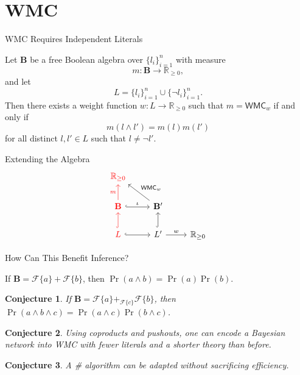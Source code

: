 \documentclass{beamer}
\newtheorem{conjecture}{Conjecture}
\begin{document}
\section{WMC}

\begin{frame}{WMC Requires Independent Literals}
  \begin{theorem}
    Let $\mathbf{B}$ be a free Boolean algebra over $\{ l_i \}_{i=1}^n$ with
    measure
    \[
      m\colon \mathbf{B} \to \mathbb{R}_{\ge 0},
    \]
    and let
    \[
      L = \{ l_i \}_{i = 1}^n \cup \{\neg l_i \}_{i = 1}^n.
    \]
    Then there exists a weight function $w\colon L \to \mathbb{R}_{\ge 0}$ such
    that $m = \mathsf{WMC}_w$ if and only if
    \[
      m(l \land l') = m(l)m(l')
    \]
    for all distinct $l, l' \in L$ such that $l \ne \neg l'$.
  \end{theorem}
\end{frame}

\begin{frame}[fragile]{Extending the Algebra}
  \[
    \begin{tikzcd}
      \textcolor{red}{\mathbb{R}_{\ge 0}} & & \\
      \textcolor{red}{\mathbf{B}} \arrow[red]{u}{m} \ar[r,hookrightarrow,"\iota"]
      & \mathbf{B'} \arrow{lu}[swap]{\mathsf{WMC}_w} & \\
      \textcolor{red}{L} \ar[u,red,hookrightarrow] \ar[r,hookrightarrow] & L'
      \ar[u,hookrightarrow] \arrow{r}{w} & \mathbb{R}_{\ge 0}
    \end{tikzcd}
  \]
\end{frame}

\begin{frame}{How Can This Benefit Inference?}
  \begin{theorem}
    If $\mathbf{B} = \mathcal{F}\{a\} + \mathcal{F}\{b\}$, then $\Pr(a \land b) =
    \Pr(a)\Pr(b)$.
  \end{theorem}
  \pause
  \begin{conjecture}
    If $\mathbf{B} = \mathcal{F}\{a\} +_{\mathcal{F}\{c\}} \mathcal{F}\{b\}$, then $\Pr(a
    \land b \land c) = \Pr(a \land c)\Pr(b \land c)$.
  \end{conjecture}
  \pause
  \begin{conjecture}
    Using coproducts and pushouts, one can encode a Bayesian network into WMC
    with \alert{fewer literals} and a \alert{shorter theory} than before.
  \end{conjecture}
  \pause
  \begin{conjecture}
    A \#\SAT{} algorithm can be adapted without sacrificing efficiency.
  \end{conjecture}
\end{frame}
\end{document}

